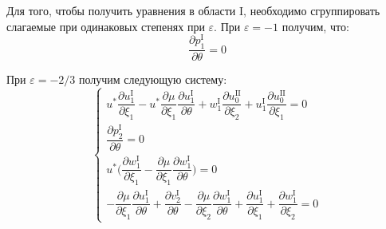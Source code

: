 \documentclass[../master.tex]{subfiles}
\begin{document}
Для того, чтобы получить уравнения в области I, необходимо сгруппировать слагаемые при одинаковых степенях при $\varepsilon$. 
При $\varepsilon=-1$ получим, что:
\begin{equation}
	\dfrac{\partial p_1^{\text{I}}}{\partial \theta} = 0
\end{equation}

При $\varepsilon=-2/3$ получим следующую систему:
\begin{equation}
	\begin{cases}
		u^*\dfrac{\partial u_1^{\text{I}}}{\partial \xi_1} -u^* \dfrac{\partial \mu}{\partial \xi_1} \dfrac{\partial u_1^{\text{I}}}{\partial \theta}  + w_1^{\text{I}}\dfrac{\partial u_0^{\text{II}}}{\partial \xi_2} +  u_1^{\text{I}}\dfrac{\partial u_0^{\text{II}}}{\partial \xi_1} = 0 \\[2ex]		
		\dfrac{\partial p_2^{\text{I}}}{\partial \theta} = 0 \\[2ex]
		u^*\bigg( \dfrac{\partial w_1^{\text{I}}}{\partial \xi_1} -  \dfrac{\partial \mu}{\partial \xi_1} \dfrac{\partial w_1^{\text{I}}}{\partial \theta} \bigg) = 0 \\[2ex]
		-\dfrac{\partial \mu}{\partial \xi_1} \dfrac{\partial u_1^{\text{I}}}{\partial \theta} + 
			 \dfrac{\partial v_2^{\text{I}}}{\partial \theta} - 
			 \dfrac{\partial \mu}{\partial \xi_2} \dfrac{\partial w_1^{\text{I}}}{\partial \theta} + 
			 \dfrac{\partial u_1^{\text{I}}}{\partial \xi_1} + 
			 \dfrac{\partial w_1^{\text{I}}}{\partial \xi_2} = 0
	\end{cases}
\end{equation}
\end{document}
